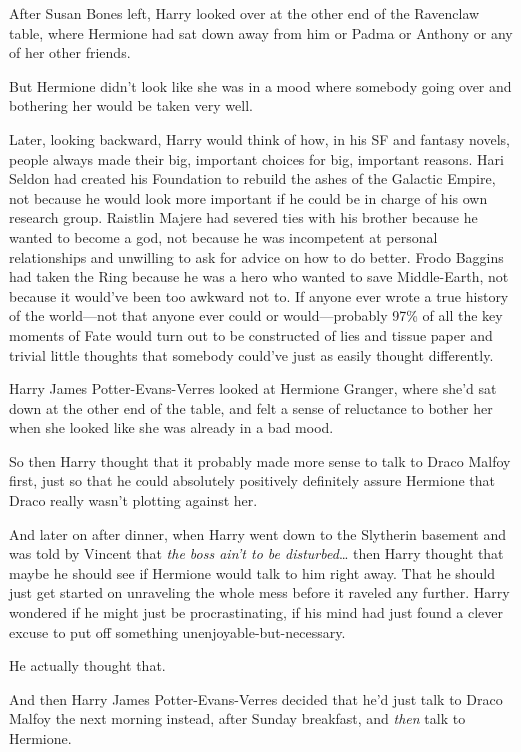 After Susan Bones left, Harry looked over at the other end of the Ravenclaw 
table, where Hermione had sat down away from him or Padma or Anthony or any of 
her other friends.

But Hermione didn't look like she was in a mood where somebody going over and 
bothering her would be taken very well.

Later, looking backward, Harry would think of how, in his SF and fantasy 
novels, people always made their big, important choices for big, important 
reasons. Hari Seldon had created his Foundation to rebuild the ashes of the 
Galactic Empire, not because he would look more important if he could be in 
charge of his own research group. Raistlin Majere had severed ties with his 
brother because he wanted to become a god, not because he was incompetent at 
personal relationships and unwilling to ask for advice on how to do better. 
Frodo Baggins had taken the Ring because he was a hero who wanted to save 
Middle-Earth, not because it would've been too awkward not to. If anyone ever 
wrote a true history of the world---not that anyone ever could or 
would---probably 97\% of all the key moments of Fate would turn out to be 
constructed of lies and tissue paper and trivial little thoughts that somebody 
could've just as easily thought differently.

Harry James Potter-Evans-Verres looked at Hermione Granger, where she'd sat 
down at the other end of the table, and felt a sense of reluctance to bother 
her when she looked like she was already in a bad mood.

So then Harry thought that it probably made more sense to talk to Draco Malfoy 
first, just so that he could absolutely positively definitely assure Hermione 
that Draco really wasn't plotting against her.

And later on after dinner, when Harry went down to the Slytherin basement and 
was told by Vincent that \emph{the boss ain't to be disturbed}{\ldots} then 
Harry thought that maybe he should see if Hermione would talk to him right 
away. That he should just get started on unraveling the whole mess before it 
raveled any further. Harry wondered if he might just be procrastinating, if his 
mind had just found a clever excuse to put off something 
unenjoyable-but-necessary.

He actually thought that.

And then Harry James Potter-Evans-Verres decided that he'd just talk to Draco 
Malfoy the next morning instead, after Sunday breakfast, and \emph{then} talk 
to Hermione.

